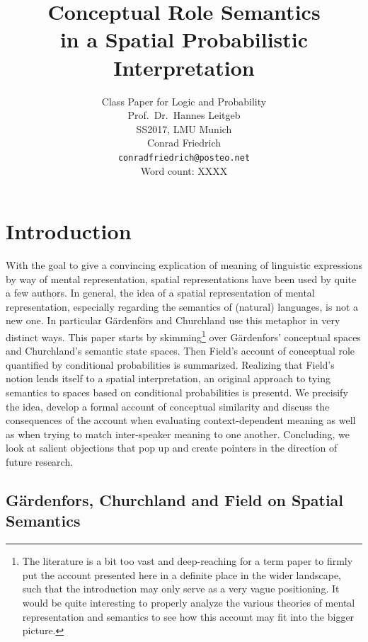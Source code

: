 \documentclass[11pt, a4paper]{scrartcl}
\title{\osfamily{}Conceptual Role Semantics \\ in a Spatial Probabilistic Interpretation}
\author{Class Paper for Logic and Probability \\ Prof.\ Dr.\ Hannes Leitgeb \\ SS2017, LMU Munich \\ Conrad Friedrich \\ \texttt{conradfriedrich@posteo.net} \\ Word count: {\color{red} XXXX}}
\begin{document}
\maketitle
\thispagestyle{empty}
\tableofcontents

\section{Introduction}

With the goal to give a convincing explication of meaning of linguistic expressions by way of mental representation, spatial representations have been used by quite a few authors. In general, the idea of a spatial representation of mental representation, especially regarding the semantics of (natural) languages, is not a new one. In particular Gärdenförs and Churchland use this metaphor in very distinct ways. This paper starts by skimming\footnote{The literature is a bit too vast and deep-reaching for a term paper to firmly put the account presented here in a definite place in the wider landscape, such that the introduction may only serve as a very vague positioning. It would be quite interesting to properly analyze the various theories of mental representation and semantics to see how this account may fit into the bigger picture.} over Gärdenfors' conceptual spaces and Churchland's semantic state spaces. Then Field's account of conceptual role quantified by conditional probabilities is summarized. Realizing that Field's notion lends itself to a spatial interpretation, an original approach to tying semantics to spaces based on conditional probabilities is presentd. We precisify the idea, develop a formal account of conceptual similarity and discuss the consequences of the account when evaluating context-dependent meaning as well as when trying to match inter-speaker meaning to one another. Concluding, we look at salient objections that pop up and create pointers in the direction of future research.  

\subsection{Gärdenfors, Churchland and Field on Spatial Semantics}
\end{document}
